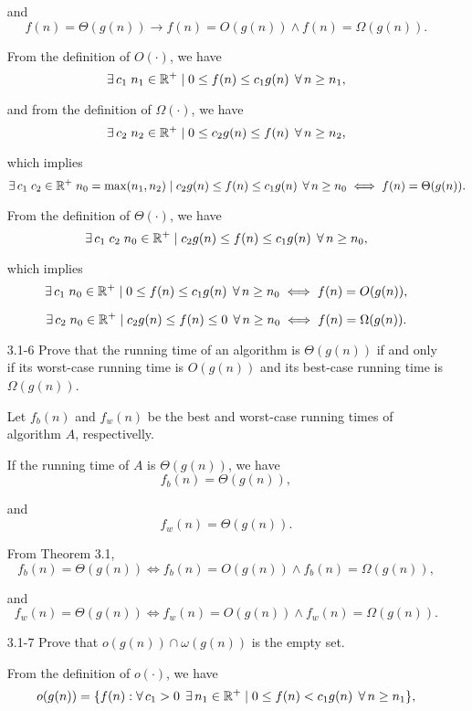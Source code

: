 \begin{enumerate}
\begin{framed}
and
\[
f(n) = \Theta(g(n)) \rightarrow f(n) = O(g(n)) \wedge f(n) = \Omega(g(n)).
\]

From the definition of $O(\cdot)$, we have
\[
\operatorname{\exists} c_1\;n_1\in\mathbb{R}^+ \mid 0 \le f(n) \le c_1g(n)\;\operatorname{\forall} n \ge n_1,
\]

and from the definition of $\Omega(\cdot)$, we have
\[
\operatorname{\exists} c_2\;n_2\in\mathbb{R}^+ \mid 0 \le c_2g(n) \le f(n)\;\operatorname{\forall} n \ge n_2,
\]

which implies
\[
\operatorname{\exists} c_1\;c_2\in\mathbb{R}^+\;n_0 = \max(n_1, n_2) \mid
c_2g(n) \leq f(n) \leq c_1g(n)\;\operatorname{\forall} n \ge n_0 \iff f(n) = \Theta(g(n)).
\]

From the definition of $\Theta(\cdot)$, we have
\[
\operatorname{\exists} c_1\;c_2\;n_0\in\mathbb{R}^+ \mid c_2g(n) \leq f(n) \leq c_1g(n)\;
\operatorname{\forall} n \ge n_0,
\]

which implies
\[
\operatorname{\exists} c_1\;n_0\in\mathbb{R}^+ \mid 0 \leq f(n) \leq c_1 g(n)\;
\operatorname{\forall} n \ge n_0 \iff f(n) = O(g(n)),
\]

\[
\operatorname{\exists} c_2\;n_0\in\mathbb{R}^+ \mid c_2 g(n) \leq f(n) \leq 0\;
\operatorname{\forall} n \ge n_0 \iff f(n) = \Omega(g(n)).
\]

\end{framed}

\newpage

\item[3.1{-}6]{Prove that the running time of an algorithm is $\Theta(g(n))$ if
  and only if its worst-case running time is $O(g(n))$ and its best-case running
  time is $\Omega(g(n))$.}

\begin{framed}
Let $f_b(n)$ and $f_w(n)$ be the best and worst-case running times of algorithm
$A$, respectivelly.

If the running time of $A$ is $\Theta(g(n))$, we have
\[
f_b(n) = \Theta(g(n)),
\]

and
\[
f_w(n) = \Theta(g(n)).
\]

From Theorem 3.1,
\[
f_b(n) = \Theta(g(n)) \iff f_b(n) = O(g(n)) \wedge f_b(n) = \Omega(g(n)),
\]

and
\[
f_w(n) = \Theta(g(n)) \iff f_w(n) = O(g(n)) \wedge f_w(n) = \Omega(g(n)).
\]

\end{framed}

\item[3.1{-}7]{Prove that $o(g(n)) \cap \omega(g(n))$ is the empty set.}

\begin{framed}
From the definition of $o(\cdot)$, we have
\[
o(g(n)) = \{ f(n) : \operatorname{\forall} c_1 > 0\;\operatorname{\exists} n_1 \in \mathbb{R}^+ \mid
             0 \le f(n) < c_1g(n)\;\operatorname{\forall} n \ge n_1 \},
\]


\end{framed}
\end{enumerate}
